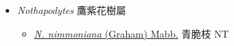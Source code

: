 
  \begin{itemize}
 \item[] \textit{Nothapodytes} 鷹紫花樹屬
                    
  \begin{itemize}
        \item[] \href{http://www.theplantlist.org/tpl1.1/search?q=Nothapodytes+nimmoniana}{\textit{N. nimmoniana} (Graham) Mabb.}   青脆枝 NT
  \end{itemize}
  \end{itemize}
